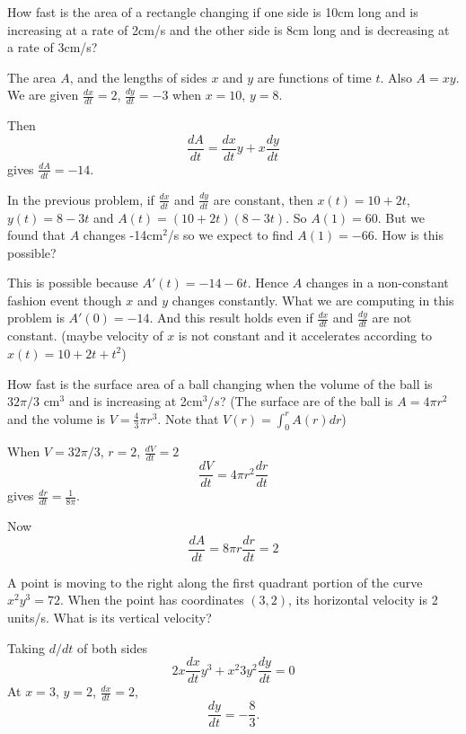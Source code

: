\documentclass[../calc1-main.tex]{subfiles}
\begin{document}
\begin{example}
  How fast is the area of a rectangle changing if one side is 10cm long and is increasing at a rate of 2cm/s and the other side is 8cm long and is decreasing at a rate of 3cm/s?
\end{example}
\begin{solution}
  The area $A$, and the lengths of sides $x$ and $y$ are functions of time $t$. Also $A = x y$. We are given $\frac{dx}{dt} = 2$, $\frac{dy}{dt} = -3$ when $x=10$, $y=8$.

  Then
  \[
    \frac{dA}{dt} = \frac{dx}{dt} y + x \frac{dy}{dt}
  \]
  gives $\frac{dA}{dt} = -14$.
\end{solution}
In the previous problem, if $\frac{dx}{dt}$ and $\frac{dy}{dt}$ are constant, then $x(t) = 10 + 2t$, $y(t) = 8-3t$ and $A(t) = (10+2t)(8-3t)$. So $A(1) = 60$. But we found that $A$ changes -14cm$^2$/s so we expect to find $A(1)=-66$. How is this possible?

This is possible because $A'(t) = -14 - 6t$. Hence $A$ changes in a non-constant fashion event though $x$ and $y$ changes constantly. What we are computing in this problem is $A'(0) = - 14$. And this result holds even if $\frac{dx}{dt}$ and $\frac{dy}{dt}$ are not constant. (maybe velocity of $x$ is not constant and it accelerates according to $x(t) = 10 + 2t + t^2$)

\begin{example}
  How fast is the surface area of a ball changing when the volume of the ball is $32 \pi/3$ cm$^3$ and is increasing at 2cm$^3/s$? (The surface are of the ball is $A = 4\pi r^2$ and the volume is $V = \frac{4}{3} \pi r^3$. Note that $V(r) = \int_0^r A(r) dr$)
\end{example}
\begin{solution}
  When $V=32 \pi/3$, $r=2$, $\frac{dV}{dt} = 2$
  \[
    \frac{dV}{dt} = 4 \pi r^2 \frac{dr}{dt}
  \]
  gives $\frac{dr}{dt} = \frac{1}{8 \pi}$.

  Now
  \[
    \frac{dA}{dt} = 8 \pi r \frac{dr}{dt} = 2
  \]
\end{solution}

\begin{example}
  A point is moving to the right along the first quadrant portion of the curve $x^2 y^3 = 72$. When the point has coordinates $(3,2)$, its horizontal velocity is 2 units/s. What is its vertical velocity?
\end{example}
\begin{solution}
  Taking $d/dt$ of both sides
  \[
    2x \frac{dx}{dt} y^3 + x^2 3 y^2 \frac{dy}{dt} = 0
  \]
  At $x=3$, $y=2$, $\frac{dx}{dt} = 2$,
  \[
    \frac{dy}{dt} = - \frac{8}{3}.
  \]

\end{solution}
\end{document}

